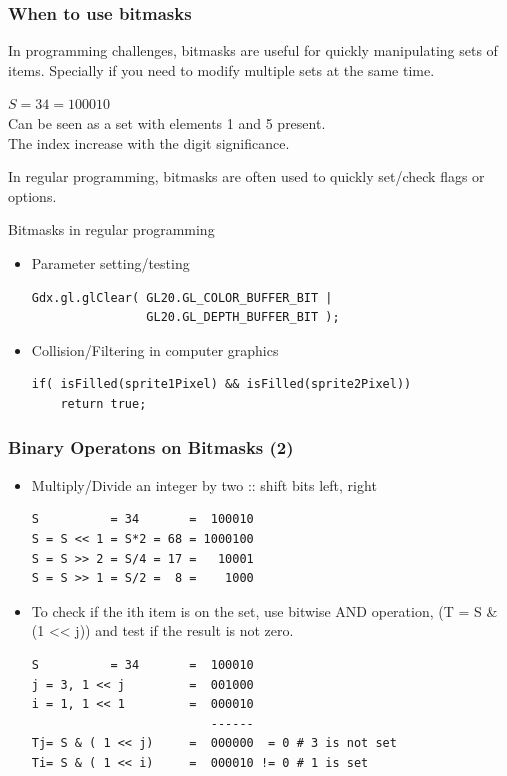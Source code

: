 \documentclass{beamer}
\begin{document}
\begin{frame}
  \frametitle{When to use bitmasks} 
  
  {\smaller In programming challenges, bitmasks are useful for quickly
    manipulating sets of items. Specially if you need to modify
    multiple sets at the same time.  

    \begin{block}{}
      $S = 34 = 100010$\\
      \medskip
      Can be seen as a set with elements 1 and 5 present.\\ 
      The index increase with the digit significance.
    \end{block}
    
    \bigskip

    In regular programming, bitmasks are often used to quickly
    set/check flags or options.
    
    \begin{block}{Bitmasks in regular programming}
      \begin{itemize}
      \item Parameter setting/testing
\begin{verbatim}
Gdx.gl.glClear( GL20.GL_COLOR_BUFFER_BIT | 
                GL20.GL_DEPTH_BUFFER_BIT );
\end{verbatim}
      \item Collision/Filtering in computer graphics
\begin{verbatim}
if( isFilled(sprite1Pixel) && isFilled(sprite2Pixel))
    return true;
\end{verbatim}
      \end{itemize}
    \end{block}
  }
\end{frame}

\begin{frame}
  \frametitle{Binary Operatons on Bitmasks (2)}
{\smaller

  \begin{itemize}
  \item Multiply/Divide an integer by two :: shift bits left, right
\begin{verbatim}
S          = 34       =  100010
S = S << 1 = S*2 = 68 = 1000100
S = S >> 2 = S/4 = 17 =   10001
S = S >> 1 = S/2 =  8 =    1000
\end{verbatim}
\item To check if the ith item is on the set, use bitwise AND
  operation, (T = S \& (1 << j)) and test if the result is not zero.
\begin{verbatim}
S          = 34       =  100010
j = 3, 1 << j         =  001000
i = 1, 1 << 1         =  000010
                         ------
Tj= S & ( 1 << j)     =  000000  = 0 # 3 is not set
Ti= S & ( 1 << i)     =  000010 != 0 # 1 is set
\end{verbatim}

  \end{itemize}

}
\end{frame}
\end{document}
